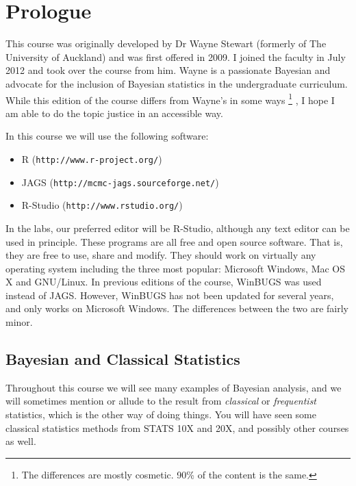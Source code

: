 \section{Prologue}
This course was originally developed by Dr Wayne Stewart (formerly of The
University of
Auckland) and was first offered in 2009. I joined the faculty in July 2012
and took over the course from him. Wayne is a passionate Bayesian and advocate
for the inclusion of Bayesian statistics in the undergraduate curriculum.
While this edition of the course differs from Wayne's in some ways
\footnote{The differences are mostly cosmetic. 90\% of the content is the same.}
, I hope I am able to do the topic justice in an accessible way.

In this course we will use the following software:
\begin{itemize}
\item R ({\tt http://www.r-project.org/}) \\
\item JAGS ({\tt http://mcmc-jags.sourceforge.net/}) \\
\item R-Studio ({\tt http://www.rstudio.org/})
\end{itemize}
In the labs, our preferred editor will be R-Studio, although any text editor
can be used in principle. These programs are all free and open source software.
That is, they are free to use, share and modify. They should work on
virtually any operating system including the three most popular:
Microsoft Windows, Mac OS X and GNU/Linux. In previous editions of the course,
WinBUGS was used instead of JAGS. However, WinBUGS has not been updated for
several years, and only works on Microsoft Windows. The differences between
the two are fairly minor.

\subsection{Bayesian and Classical Statistics}
Throughout this course we will see many examples of Bayesian analysis, and we
will sometimes mention or allude to the result from {\it classical} or
{\it frequentist} statistics, which is the other way of doing things. You will
have seen some classical statistics methods from STATS 10X and 20X, and
possibly other courses as well.

